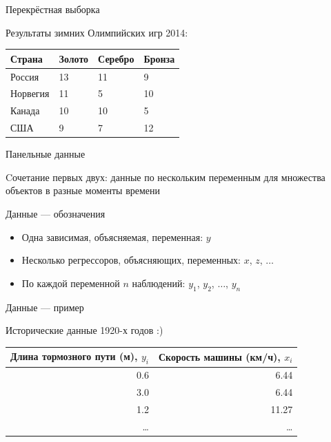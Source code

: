 \begin{frame}{Перекрёстная выборка}

Результаты зимних Олимпийских игр 2014:

\begin{longtable}[c]{@{}llll@{}}
\toprule
Страна & Золото & Серебро & Бронза\tabularnewline
\midrule
\endhead
Россия & 13 & 11 & 9\tabularnewline
Норвегия & 11 & 5 & 10\tabularnewline
Канада & 10 & 10 & 5\tabularnewline
США & 9 & 7 & 12\tabularnewline
\bottomrule
\end{longtable}

\end{frame}

\begin{frame}{Панельные данные}

Cочетание первых двух: данные по нескольким переменным для множества
объектов в разные моменты времени

\end{frame}

\begin{frame}{Данные --- обозначения}

\begin{itemize}
\tightlist
\item
  Одна зависимая, объясняемая, переменная: \(y\)
\item
  Несколько регрессоров, объясняющих, переменных: \(x\), \(z\),
  \(\ldots\)
\item
  По каждой переменной \(n\) наблюдений: \(y_1\), \(y_2\), \(\ldots\),
  \(y_n\)
\end{itemize}

\end{frame}

\begin{frame}{Данные --- пример}

Исторические данные 1920-х годов :)

\begin{longtable}[c]{@{}rr@{}}
\toprule
Длина тормозного пути (м), \(y_i\) & Скорость машины (км/ч),
\(x_i\)\tabularnewline
\midrule
\endhead
0.6 & 6.44\tabularnewline
3.0 & 6.44\tabularnewline
1.2 & 11.27\tabularnewline
\ldots{} & \ldots{}\tabularnewline
\bottomrule
\end{longtable}

\end{frame}

